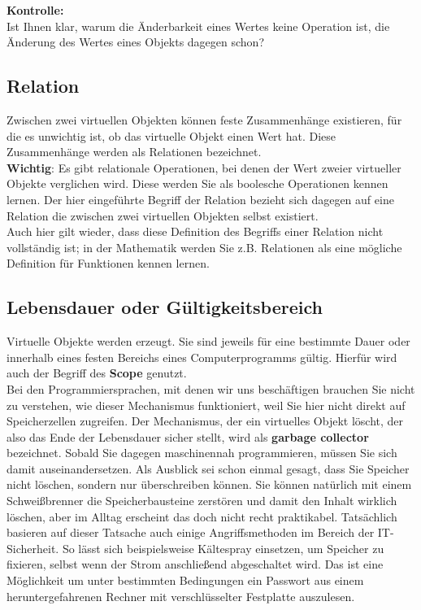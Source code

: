 \textbf{Kontrolle:}\\

Ist Ihnen klar, warum die Änderbarkeit eines Wertes keine Operation ist, die Änderung des Wertes eines Objekts dagegen schon?

\subsection{Relation}

Zwischen zwei virtuellen Objekten können feste Zusammenhänge existieren, für die es unwichtig ist, ob das virtuelle Objekt einen Wert hat. Diese Zusammenhänge werden als Relationen bezeichnet. \\

\textbf{Wichtig}: Es gibt relationale Operationen, bei denen der Wert zweier virtueller Objekte verglichen wird. Diese werden Sie als boolesche Operationen kennen lernen. Der hier eingeführte Begriff der Relation bezieht sich dagegen auf eine Relation die zwischen zwei virtuellen Objekten selbst existiert.\\

Auch hier gilt wieder, dass diese Definition des Begriffs einer Relation nicht vollständig ist; in der Mathematik werden Sie z.B. Relationen als eine mögliche Definition für Funktionen kennen lernen.

\subsection{Lebensdauer oder Gültigkeitsbereich}

Virtuelle Objekte werden erzeugt. Sie sind jeweils für eine bestimmte Dauer oder innerhalb eines festen Bereichs eines Computerprogramms gültig. Hierfür wird auch der Begriff des \textbf{Scope} genutzt.\\

Bei den Programmiersprachen, mit denen wir uns beschäftigen brauchen Sie nicht zu verstehen, wie dieser Mechanismus funktioniert, weil Sie hier nicht direkt auf Speicherzellen zugreifen. Der Mechanismus, der ein virtuelles Objekt \glqq{}löscht\grqq{}, der also das Ende der Lebensdauer sicher stellt, wird als \textbf{garbage collector} bezeichnet. Sobald Sie dagegen maschinennah programmieren, müssen Sie sich damit auseinandersetzen. Als Ausblick sei schon einmal gesagt, dass Sie Speicher nicht löschen, sondern nur überschreiben können. Sie können natürlich mit einem Schweißbrenner die Speicherbausteine zerstören und damit den Inhalt wirklich löschen, aber im Alltag erscheint das doch nicht recht praktikabel. Tatsächlich basieren auf dieser Tatsache auch einige Angriffsmethoden im Bereich der IT-Sicherheit. So lässt sich beispielsweise Kältespray einsetzen, um Speicher zu fixieren, selbst wenn der Strom anschließend abgeschaltet wird. Das ist eine Möglichkeit um unter bestimmten Bedingungen ein Passwort aus einem heruntergefahrenen Rechner mit verschlüsselter Festplatte auszulesen.

